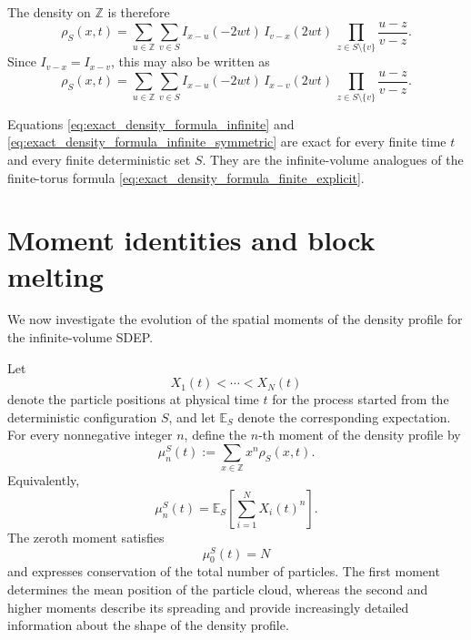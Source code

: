 \documentclass[11pt]{article}
\numberwithin{equation}{section}
\newcommand{\1}{\mathbf 1}
\begin{document}
The density on \(\mathbb Z\) is therefore
\begin{equation}
    \rho_S(x,t)
    =
    \sum_{u\in\mathbb Z}
    \sum_{v\in S}
    I_{x-u}(-2wt)\,
    I_{v-x}(2wt)\,
    \prod_{z\in S\setminus\{v\}}
    \frac{u-z}{v-z}.
    \label{eq:exact_density_formula_infinite}
\end{equation}
Since \(I_{v-x}=I_{x-v}\), this may also be written as
\begin{equation}
    \rho_S(x,t)
    =
    \sum_{u\in\mathbb Z}
    \sum_{v\in S}
    I_{x-u}(-2wt)\,
    I_{x-v}(2wt)\,
    \prod_{z\in S\setminus\{v\}}
    \frac{u-z}{v-z}.
    \label{eq:exact_density_formula_infinite_symmetric}
\end{equation}

Equations \eqref{eq:exact_density_formula_infinite} and
\eqref{eq:exact_density_formula_infinite_symmetric} are exact for every finite
time \(t\) and every finite deterministic set \(S\).  They are the
infinite-volume analogues of the finite-torus formula
\eqref{eq:exact_density_formula_finite_explicit}.
\section{Moment identities and block melting}
\label{sec:block_melting}

We now investigate the evolution of the spatial moments of the density profile
for the infinite-volume SDEP. 

Let
\[
    X_1(t)<\cdots<X_N(t)
\]
denote the particle positions at physical time \(t\) for the process started
from the deterministic configuration \(S\), and let \(\mathbb E_S\) denote the
corresponding expectation.  For every nonnegative integer \(n\), define the
\(n\)-th moment of the density profile by
\begin{equation}
    \mu_n^S(t)
    :=
    \sum_{x\in\mathbb Z}x^n\rho_S(x,t).
    \label{eq:density_moment_definition}
\end{equation}
Equivalently, 
\begin{equation}
    \mu_n^S(t)
    =
    \mathbb E_S\left[
        \sum_{i=1}^N X_i(t)^n
    \right].
    \label{eq:density_moment_probabilistic_representation}
\end{equation}
The zeroth moment satisfies
$$
\mu_0^S(t)=N
$$
and expresses conservation of the total number of particles.  The first
moment determines the mean position of the particle cloud, whereas the second
and higher moments describe its spreading and provide increasingly detailed
information about the shape of the density profile.
\end{document}
